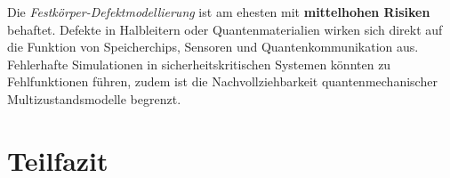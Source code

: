 \vspace{0.5em}

Die \textit{Festkörper-Defektmodellierung} ist am ehesten mit \textbf{mittelhohen Risiken} behaftet. Defekte in Halbleitern oder Quantenmaterialien wirken sich direkt auf die Funktion von Speicherchips, Sensoren und Quantenkommunikation aus. Fehlerhafte Simulationen in sicherheitskritischen Systemen könnten zu Fehlfunktionen führen, zudem ist die Nachvollziehbarkeit quantenmechanischer Multizustandsmodelle begrenzt. \cite{orus_quantum_2019,freysoldt_first-principles_2014}


\section{Teilfazit}


\printbibliography
